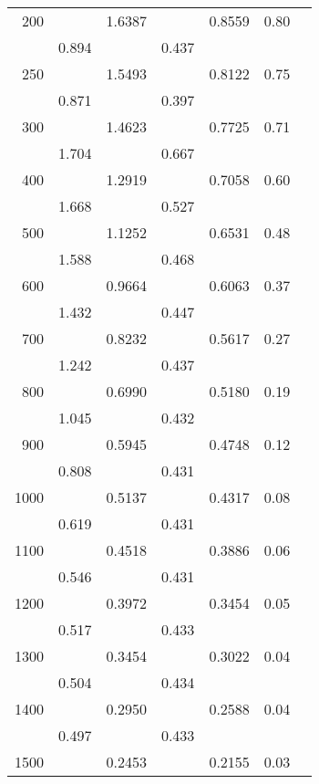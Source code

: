 \begin{table}[t!]
\begin{tabular*}{97mm}{@{}rrrrrrl}
200&               &    1.6387&        &    0.8559& 0.80\\
 &      0.894  &       & 0.437              \\
250&            &   1.5493&        &    0.8122& 0.75\\
 &      0.871  &       & 0.397              \\
300&               &    1.4623&        &    0.7725& 0.71\\
 &      1.704  &       & 0.667              \\
400&               &    1.2919&        &    0.7058& 0.60\\
 &      1.668  &       & 0.527              \\
500&               &    1.1252&        &    0.6531& 0.48\\
 &      1.588  &       & 0.468              \\
600&               &    0.9664&        &    0.6063& 0.37\\
 &      1.432  &       & 0.447              \\
700&               &    0.8232&        &    0.5617& 0.27\\
 &      1.242  &       & 0.437              \\
800&               &    0.6990&        &    0.5180& 0.19\\
 &      1.045  &       & 0.432              \\
900&               &    0.5945&        &    0.4748& 0.12\\
 &      0.808  &       & 0.431              \\
1000&             & 0.5137&        &    0.4317& 0.08\\
 &      0.619  &       & 0.431              \\
1100&             & 0.4518&        &    0.3886& 0.06\\
 &      0.546  &       & 0.431              \\
1200&             & 0.3972&        &    0.3454& 0.05\\
 &      0.517  &       & 0.433              \\
1300&             & 0.3454&        &    0.3022& 0.04\\
 &      0.504  &       & 0.434              \\
1400&             & 0.2950&        &    0.2588& 0.04\\
 &      0.497  &       & 0.433              \\
1500&             & 0.2453&        &    0.2155& 0.03\\

\end{tabular*}
\end{table}
